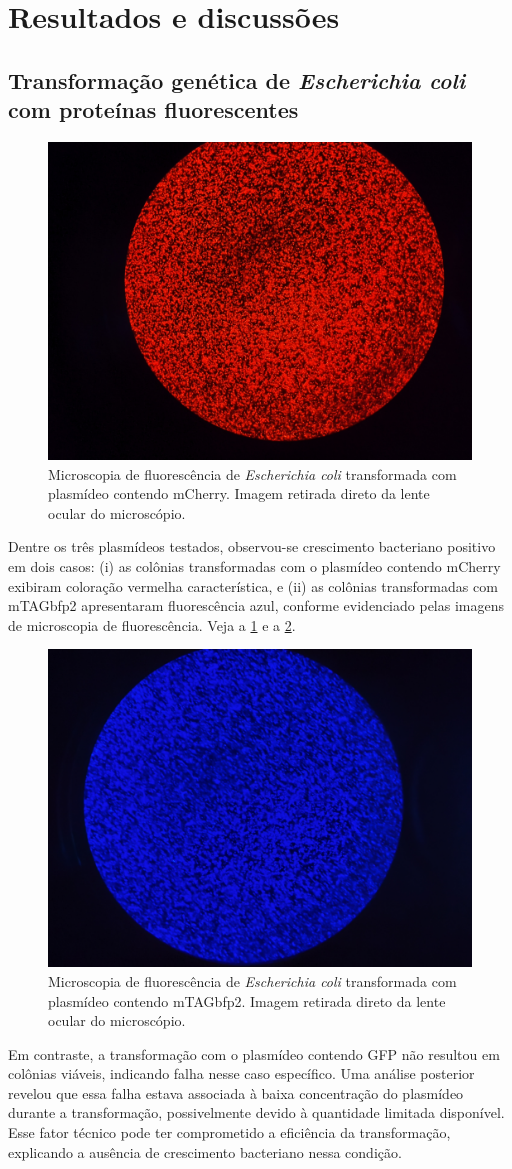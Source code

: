 \section{Resultados e discussões}
\subsection{Transformação genética de \textit{Escherichia coli} com proteínas
fluorescentes}
\begin{figure}
    \centering
    \includegraphics[width=.30\textwidth]{fig/red.jpg}
    \caption{Microscopia de fluorescência de \textit{Escherichia coli}
    transformada com plasmídeo contendo mCherry. Imagem retirada direto da lente
    ocular do microscópio.}
    \label{mCherry}
\end{figure}
Dentre os três plasmídeos testados, observou-se crescimento
bacteriano positivo em dois casos: (i) as colônias transformadas com o plasmídeo
contendo mCherry exibiram coloração vermelha característica, e (ii) as colônias
transformadas com mTAGbfp2 apresentaram fluorescência azul, conforme evidenciado
pelas imagens de microscopia de fluorescência. Veja a \cref{mCherry} e a
\cref{mTAG}.

\begin{figure}
    \centering
    \includegraphics[width=.30\textwidth]{fig/blue.jpg}
    \caption{Microscopia de fluorescência de \textit{Escherichia coli}
    transformada com plasmídeo contendo mTAGbfp2. Imagem retirada direto da lente
    ocular do microscópio.}
    \label{mTAG}
\end{figure}

Em contraste, a transformação com o plasmídeo contendo GFP não resultou em
colônias viáveis, indicando falha nesse caso específico. Uma análise posterior
revelou que essa falha estava associada à baixa concentração do plasmídeo
durante a transformação, possivelmente devido à quantidade limitada disponível.
Esse fator técnico pode ter comprometido a eficiência da transformação,
explicando a ausência de crescimento bacteriano nessa condição.

